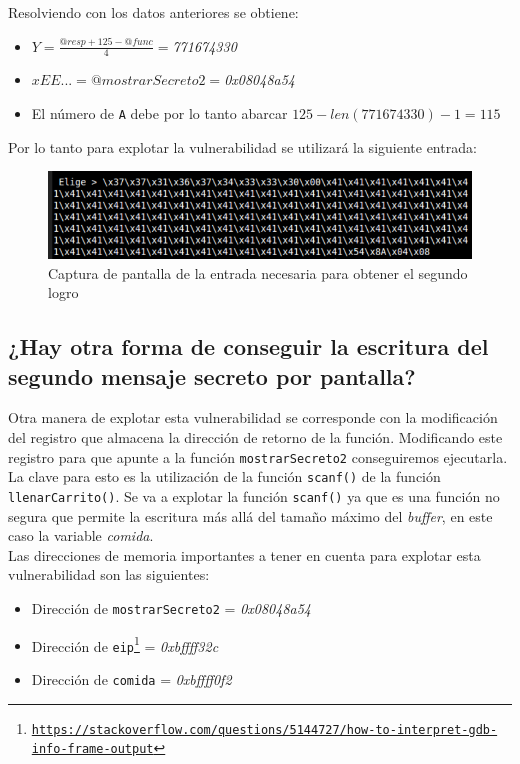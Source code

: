 \documentclass[10pt,a4paper]{article}
\begin{document}
Resolviendo con los datos anteriores se obtiene:
\begin{itemize}
\item $Y=\frac{@resp + 125 - @func}{4}=$\emph{771674330}
\item $xEE...=@mostrarSecreto2=$\emph{0x08048a54}
\item El número de \texttt{A} debe por lo tanto abarcar $125-len(771674330)-1=115$
\end{itemize}

Por lo tanto para explotar la vulnerabilidad se utilizará la siguiente entrada:

\begin{figure}[h!]
\centering
\includegraphics[scale=0.9]{images/input_segundo_logro.png}
\caption{Captura de pantalla de la entrada necesaria para obtener el segundo logro}
\label{fig:inputSegundoLogro}
\end{figure}


\subsection{¿Hay otra forma de conseguir la escritura del segundo mensaje secreto por pantalla?}

Otra manera de explotar esta vulnerabilidad se corresponde con la modificación del registro que almacena la dirección de retorno de la función. Modificando este registro para que apunte a la función \texttt{mostrarSecreto2} conseguiremos ejecutarla.\\
La clave para esto es la utilización de la función \texttt{scanf()} de la función \texttt{llenarCarrito()}. Se va a explotar la función \texttt{scanf()} ya que es una función no segura que permite la escritura más allá del tamaño máximo del \emph{buffer}, en este caso la variable \emph{comida}.\\
Las direcciones de memoria importantes a tener en cuenta para explotar esta vulnerabilidad son las siguientes:
\begin{itemize}
\item Dirección de \texttt{mostrarSecreto2} = \emph{0x08048a54}
\item Dirección de \texttt{eip\footnote{\url{https://stackoverflow.com/questions/5144727/how-to-interpret-gdb-info-frame-output}}} = \emph{0xbffff32c}
\item Dirección de \texttt{comida} = \emph{0xbffff0f2}
\end{itemize}
\end{document}
